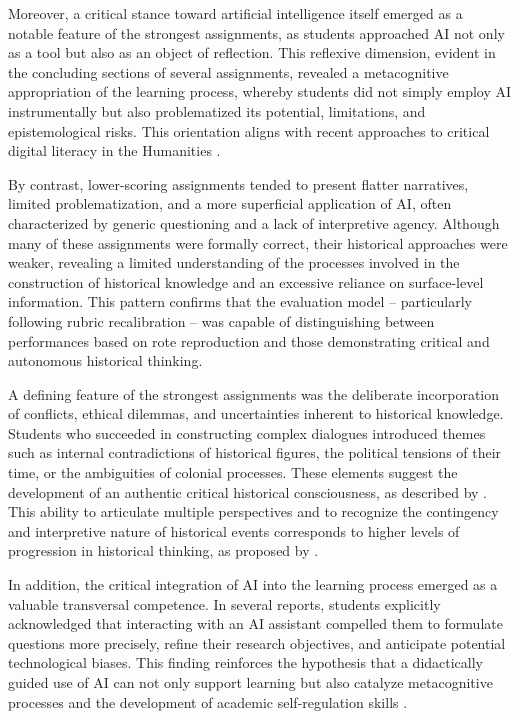 \documentclass[english]{textolivre}
\begin{document}
Moreover, a critical stance toward artificial intelligence itself emerged as a notable feature of the strongest assignments, as students approached AI not only as a tool but also as an object of reflection. This reflexive dimension, evident in the concluding sections of several assignments, revealed a metacognitive appropriation of the learning process, whereby students did not simply employ AI instrumentally but also problematized its potential, limitations, and epistemological risks. This orientation aligns with recent approaches to critical digital literacy in the Humanities \cite{carrasco2024, chen2025, kansteiner2022, knox2020, selwyn2021}.

By contrast, lower-scoring assignments tended to present flatter narratives, limited problematization, and a more superficial application of AI, often characterized by generic questioning and a lack of interpretive agency. Although many of these assignments were formally correct, their historical approaches were weaker, revealing a limited understanding of the processes involved in the construction of historical knowledge and an excessive reliance on surface-level information. This pattern confirms that the evaluation model -- particularly following rubric recalibration -- was capable of distinguishing between performances based on rote reproduction and those demonstrating critical and autonomous historical thinking.

A defining feature of the strongest assignments was the deliberate incorporation of conflicts, ethical dilemmas, and uncertainties inherent to historical knowledge. Students who succeeded in constructing complex dialogues introduced themes such as internal contradictions of historical figures, the political tensions of their time, or the ambiguities of colonial processes. These elements suggest the development of an authentic critical historical consciousness, as described by \textcite{rusen2005, rusen2010}. This ability to articulate multiple perspectives and to recognize the contingency and interpretive nature of historical events corresponds to higher levels of progression in historical thinking, as proposed by \textcite{ashby2000, seixas2013, alvarez2021}.

In addition, the critical integration of AI into the learning process emerged as a valuable transversal competence. In several reports, students explicitly acknowledged that interacting with an AI assistant compelled them to formulate questions more precisely, refine their research objectives, and anticipate potential technological biases. This finding reinforces the hypothesis that a didactically guided use of AI can not only support learning but also catalyze metacognitive processes and the development of academic self-regulation skills \cite{holmes2019, luckin2016, luo2025, tondeur2025}.
\end{document}
